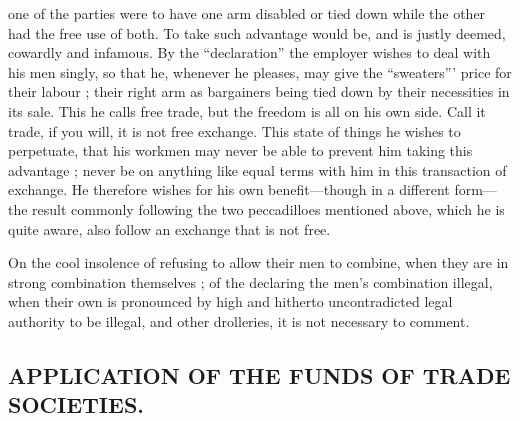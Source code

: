 one of the parties were to have one arm disabled or tied down while the
other had the free use of both. To take such advantage would be, and is
justly deemed, cowardly and infamous. By the ``declaration'' the
employer wishes to deal with his men singly, so that he, whenever he
pleases, may give the ``sweaters''' price for their labour ; their right
arm as bargainers being tied down by their necessities in its sale. This
he calls free trade, but the freedom is all on his own side. Call it
trade, if you will, it is not free exchange. This state of things he
wishes to perpetuate, that his workmen may never be able to prevent him
taking this advantage ; never be on anything like equal terms with him
in this transaction of exchange. He therefore wishes for his own
benefit---though in a different form---the result commonly following the
two peccadilloes mentioned above, which he is quite aware, also follow
an exchange that is not free.

On the cool insolence of refusing to allow their men to combine, when
they are in strong combination themselves ; of the declaring the men's
combination illegal, when their own is pronounced by high and hitherto
uncontradicted legal authority to be illegal, and other drolleries, it
is not necessary to comment.

\subsection{APPLICATION OF THE FUNDS OF TRADE SOCIETIES.}

